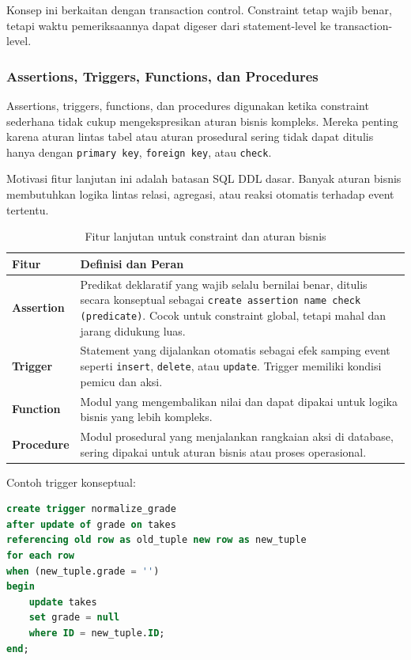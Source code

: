 Konsep ini berkaitan dengan transaction control. Constraint tetap wajib benar, tetapi waktu pemeriksaannya dapat digeser dari statement-level ke transaction-level.

\subsubsection{Assertions, Triggers, Functions, dan Procedures}

\begin{jawab}
Assertions, triggers, functions, dan procedures digunakan ketika constraint sederhana tidak cukup mengekspresikan aturan bisnis kompleks. Mereka penting karena aturan lintas tabel atau aturan prosedural sering tidak dapat ditulis hanya dengan \texttt{primary key}, \texttt{foreign key}, atau \texttt{check}.
\end{jawab}

Motivasi fitur lanjutan ini adalah batasan SQL DDL dasar. Banyak aturan bisnis membutuhkan logika lintas relasi, agregasi, atau reaksi otomatis terhadap event tertentu.

\begin{table}[H]
\centering
\begin{tabularx}{\textwidth}{|L{0.24\textwidth}|X|}
\hline
\textbf{Fitur} & \textbf{Definisi dan Peran} \\
\hline
\textbf{Assertion} & Predikat deklaratif yang wajib selalu bernilai benar, ditulis secara konseptual sebagai \texttt{create assertion name check (predicate)}. Cocok untuk constraint global, tetapi mahal dan jarang didukung luas. \\
\hline
\textbf{Trigger} & Statement yang dijalankan otomatis sebagai efek samping event seperti \texttt{insert}, \texttt{delete}, atau \texttt{update}. Trigger memiliki kondisi pemicu dan aksi. \\
\hline
\textbf{Function} & Modul yang mengembalikan nilai dan dapat dipakai untuk logika bisnis yang lebih kompleks. \\
\hline
\textbf{Procedure} & Modul prosedural yang menjalankan rangkaian aksi di database, sering dipakai untuk aturan bisnis atau proses operasional. \\
\hline
\end{tabularx}
\caption{Fitur lanjutan untuk constraint dan aturan bisnis}
\label{tab:advanced-constraints}
\end{table}

Contoh trigger konseptual:
\begin{lstlisting}[language=SQL, caption={Contoh struktur trigger konseptual}, label={lst:trigger-concept}]
create trigger normalize_grade
after update of grade on takes
referencing old row as old_tuple new row as new_tuple
for each row
when (new_tuple.grade = '')
begin
    update takes
    set grade = null
    where ID = new_tuple.ID;
end;
\end{lstlisting}

